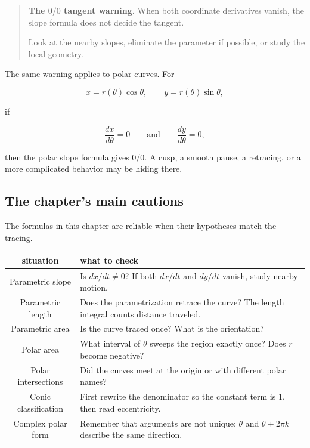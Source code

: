 \begin{quote}
\textbf{The \(0/0\) tangent warning.}
When both coordinate derivatives vanish, the slope formula does not decide the
tangent.

Look at the nearby slopes, eliminate the parameter if possible, or study the local
geometry.
\end{quote}

The same warning applies to polar curves.  For

\[
x=r(\theta)\cos\theta,
\qquad
y=r(\theta)\sin\theta,
\]

if

\[
\frac{dx}{d\theta}=0
\qquad\text{and}\qquad
\frac{dy}{d\theta}=0,
\]

then the polar slope formula gives \(0/0\).  A cusp, a smooth pause, a retracing, or a
more complicated behavior may be hiding there.

\subsection{The chapter's main cautions}
\label{subsec:chapter-main-cautions}

The formulas in this chapter are reliable when their hypotheses match the tracing.

\begin{center}
\begin{tabular}{c|p{}}
\textbf{situation} & \textbf{what to check} \\ \hline
Parametric slope & Is \(dx/dt\neq0\)? If both \(dx/dt\) and \(dy/dt\) vanish, study nearby motion. \\[3pt]
Parametric length & Does the parametrization retrace the curve? The length integral counts distance traveled. \\[3pt]
Parametric area & Is the curve traced once? What is the orientation? \\[3pt]
Polar area & What interval of \(\theta\) sweeps the region exactly once? Does \(r\) become negative? \\[3pt]
Polar intersections & Did the curves meet at the origin or with different polar names? \\[3pt]
Conic classification & First rewrite the denominator so the constant term is \(1\), then read eccentricity. \\[3pt]
Complex polar form & Remember that arguments are not unique: \(\theta\) and \(\theta+2\pi k\) describe the same direction.
\end{tabular}
\end{center}

